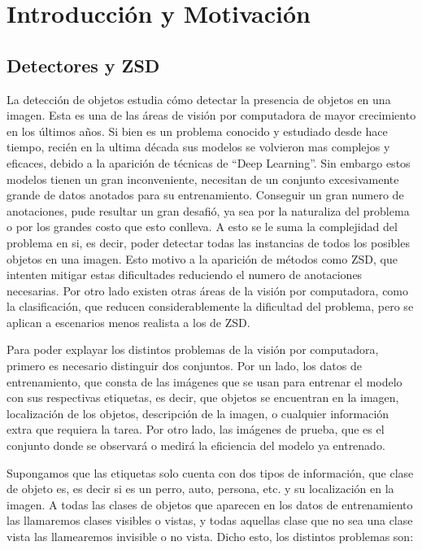 \chapter{Introducción y Motivación} \label{cap:intro}

\section{Detectores y ZSD} \label{sec:detectoresyzsd}
La detección de objetos estudia cómo detectar la presencia de objetos en una imagen. Esta es una de las áreas de visión por computadora de mayor crecimiento en los últimos años. Si bien es un problema conocido y estudiado desde hace tiempo, recién en la ultima década sus modelos se volvieron mas complejos y eficaces, debido a la aparición de técnicas  de ``Deep Learning''. Sin embargo estos modelos tienen un gran inconveniente, necesitan de un conjunto excesivamente grande de datos anotados para su entrenamiento. Conseguir un gran numero de anotaciones, pude resultar un gran desafió, ya sea por la naturaliza del problema o por los grandes costo que esto conlleva. A esto se le suma la complejidad del problema en si, es decir, poder detectar todas las instancias de todos los posibles objetos en una imagen. Esto motivo a la aparición de métodos como ZSD, que intenten mitigar estas dificultades reduciendo el numero de anotaciones necesarias. Por otro lado existen otras áreas de la visión por computadora, como la clasificación, que reducen considerablemente la dificultad del problema, pero se aplican a escenarios menos realista a los de ZSD.

Para poder explayar los distintos problemas de la visión por computadora, primero es necesario distinguir dos conjuntos. Por un lado, los datos de entrenamiento, que consta de las imágenes que se usan para entrenar el modelo con sus respectivas etiquetas, es decir, que objetos se encuentran en la imagen, localización de los objetos, descripción de la imagen, o cualquier información extra que requiera la tarea. Por otro lado, las imágenes de prueba, que es el conjunto donde se observará o medirá la eficiencia del modelo ya entrenado. 

Supongamos que las etiquetas solo cuenta con dos tipos de información, que clase de objeto es, es decir si es un perro, auto, persona, etc. y su localización en la imagen. A todas las clases de objetos que aparecen en los datos de entrenamiento las llamaremos clases visibles o vistas, y todas aquellas clase que no sea una clase vista las llamearemos invisible o no vista. Dicho esto, los distintos problemas son:

